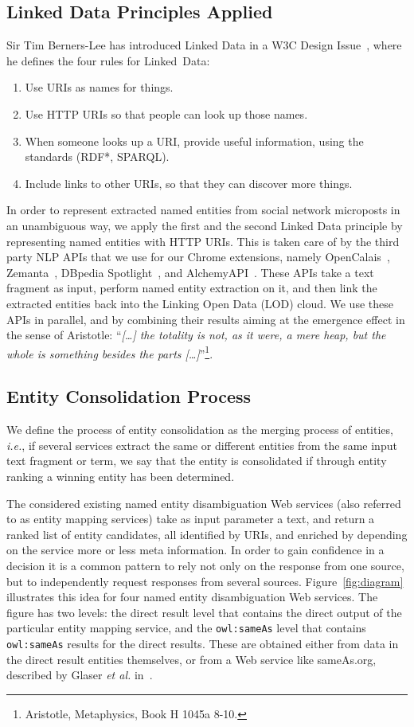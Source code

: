 \subsection{Linked Data Principles Applied}
Sir Tim Berners-Lee has introduced Linked Data in a W3C Design Issue~\cite{TimBL:LinkedData}, where he defines the four rules for Linked~Data:
\begin{enumerate}
\item Use URIs as names for things.
\item Use HTTP URIs so that people can look up those names.
\item When someone looks up a URI, provide useful information, using the standards (RDF*, SPARQL).
\item Include links to other URIs, so that they can discover more things.
\end{enumerate}
In order to represent extracted named entities from social network microposts in an unambiguous way, we apply the first and the second Linked Data principle by representing named entities with HTTP URIs. This is taken care of by the third party NLP APIs that we use for our Chrome extensions, namely OpenCalais~\cite{OpenCalais}, Zemanta~\cite{Zemanta}, DBpedia Spotlight~\cite{spotlight}, and AlchemyAPI~\cite{AlchemyAPI}. These APIs take a text fragment as input, perform named entity extraction on it, and then link the extracted entities back into the Linking Open Data (LOD) cloud. We use these APIs in parallel, and by combining their results aiming at the emergence effect in the sense of Aristotle: ``\emph{[\ldots] the totality is not, as it were, a mere heap, but the whole is something besides the parts [\ldots]}''\footnote{Aristotle, Metaphysics, Book H 1045a 8-10.}. 

\subsection{Entity Consolidation Process}
We define the process of entity consolidation as the merging process of entities, \emph{i.e.}, if several services extract the same or different
entities from the same input text fragment or term, we say that the entity is consolidated if through entity ranking a winning entity has been determined.

The considered existing named entity disambiguation Web services (also referred to as entity mapping services) take as input parameter a text, and return a ranked list of entity
candidates, all identified by URIs, and enriched by depending on the service more or less meta information. In order to
gain confidence in a decision it is a common pattern to rely not only on the response from one source, but to
independently request responses from several sources. Figure~\ref{fig:diagram} illustrates this idea for four named entity disambiguation Web services. The figure has two levels: the direct result level that contains the direct output of the 
particular entity mapping service, and the \texttt{owl:sameAs} level that contains \texttt{owl:sameAs} results for the
direct results. These are obtained either from data in the direct result entities themselves, or from a Web service
like sameAs.org, described by Glaser \emph{et al.} in~\cite{Glaser:SameAs}.

